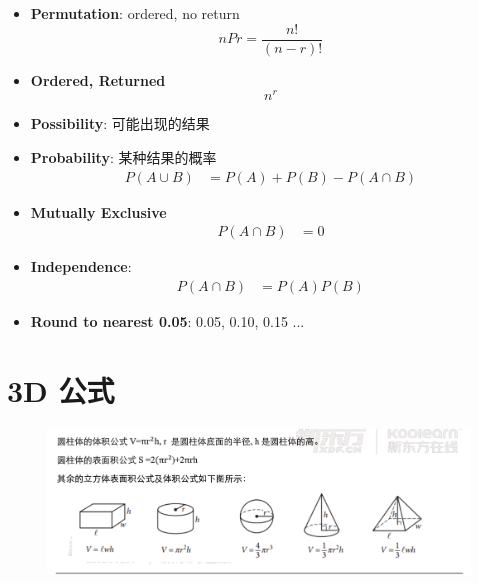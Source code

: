 \begin{multicols}{2}
\begin{itemize}
    \item \textbf{Permutation}: ordered, no return
    \begin{equation}
      n P r = \frac{n!}{\left( n - r \right)!}
    \end{equation}

    \item \textbf{Ordered, Returned}
    \begin{equation}
      n^{r}
    \end{equation}

    \item \textbf{Possibility}: 可能出现的结果
    \item \textbf{Probability}: 某种结果的概率
    \begin{align}
      P\left( A \cup B \right) &= P\left( A \right) + P\left( B \right) - P\left( A \cap B \right)
    \end{align}

    \item \textbf{Mutually Exclusive}
    \begin{align}
      P\left( A \cap B \right) &= 0
    \end{align}

    \item \textbf{Independence}:
    \begin{align}
      P\left( A \cap B \right) &= P\left( A \right) P\left( B \right)
    \end{align}

    \item \textbf{Round to nearest 0.05}: 0.05, 0.10, 0.15 ...
  \end{itemize}
\end{multicols}

\section{3D 公式}

  \begin{figure}[H]
    \centering
    \includegraphics[width=\columnwidth]{images/remember-before-test/3d-equations.png}
  \end{figure}
